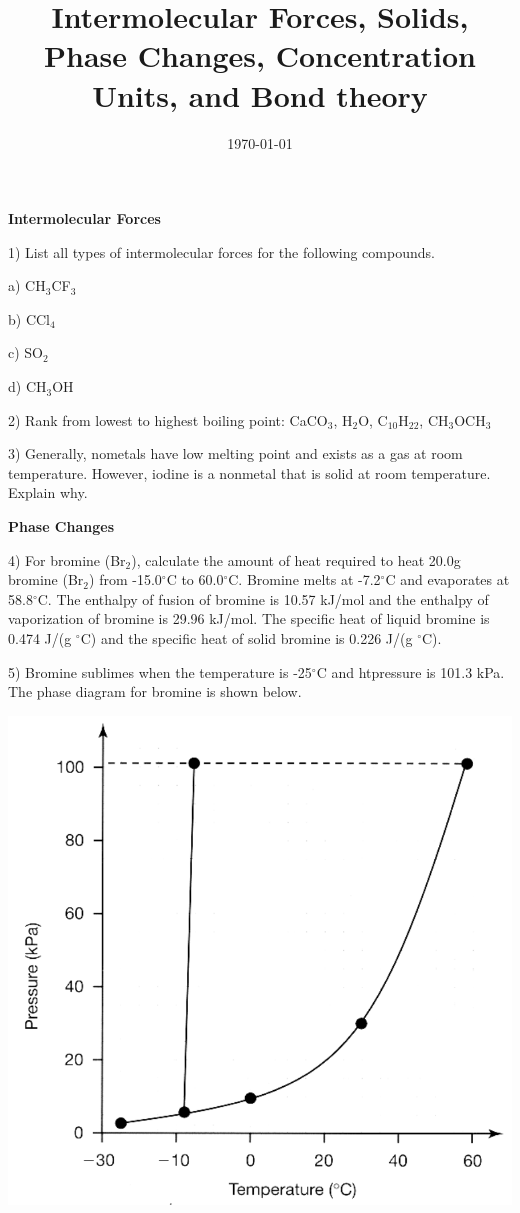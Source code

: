 \documentclass[12pt]{article}
\title{\textbf{Intermolecular Forces, Solids, Phase Changes, Concentration Units,
and Bond theory}}
\date{\today}
\begin{document}
\maketitle 

\textbf{Intermolecular Forces}

1) List all types of intermolecular forces for the following compounds.

a) CH$_3$CF$_3$

b) CCl$_4$

c) SO$_2$

d) CH$_3$OH

2) Rank from lowest to highest boiling point: CaCO$_3$, H$_2$O, C$_{10}$H$_{22}$,
CH$_3$OCH$_3$

\vspace{0.5in}

3) Generally, nometals have low melting point and exists as a gas at room temperature.
However, iodine is a nonmetal that is solid at room temperature. Explain why.

\vspace{0.5in}

\textbf{Phase Changes}

4) For bromine (Br$_2$), calculate the amount of heat required to heat 20.0g bromine (Br$_2$)
from -15.0$^\circ$C to 60.0$^\circ$C. Bromine melts at -7.2$^\circ$C and evaporates at
58.8$^\circ$C. The enthalpy of fusion of bromine is 10.57 kJ/mol and the enthalpy of
vaporization of bromine is 29.96 kJ/mol. The specific heat of liquid bromine is 0.474 J/(g $^\circ$C)
and the specific heat of solid bromine is 0.226 J/(g $^\circ$C).

\vspace{2in}

5) Bromine sublimes when the temperature is -25$^\circ$C and htpressure is 101.3 kPa. The phase
diagram for bromine is shown below.

\begin{center}
  \includegraphics[scale=0.25]{br_phase}
\end{center}
\end{document}
